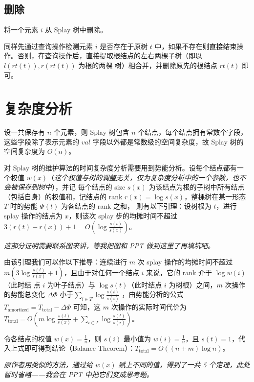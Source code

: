 \documentclass{ctexart}
\begin{document}
    \subsection{删除}

    将一个元素 $i$ 从 Splay 树中删除。

    同样先通过查询操作检测元素 $i$ 是否存在于原树 $t$ 中，如果不存在则直接结束操作。否则，在查询操作后，直接提取根结点的左右两棵子树（即以 $l(rt(t)), r(rt(t))$ 为根的两棵
    树）相合并，并删除原先的根结点 $rt(t)$ 即可。

    \section{复杂度分析}

    设一共保存有 $n$ 个元素，则 Splay 树包含 $n$ 个结点，每个结点拥有常数个字段，这些字段除了表示元素的 $val$ 字段以外都是常数级的空间复杂度，故 Splay 树的空间复杂度为 $O(n)$。

    对 Splay 树的维护算法的时间复杂度分析需要用到势能分析。设每个结点都有一个权值 $w(x)$（\textit{这个权值与树的调整无关，仅为复杂度分析中的一个参数，也不会被保存到树中}），并记
    每个结点的 size $s(x)$ 为该结点为根的子树中所有结点（包括自身）的权值和，记结点的 rank $r(x) = \log s(x)$，整棵树在某一形态 $T$ 时的势能 $\varPhi(t)$ 为各结点的 rank 之和，
    则有以下引理：设树根为 $t$，进行 splay 操作的结点为 $x$，则该次 splay 步的均摊时间不超过 $3(r(t) - r(x)) + 1 = O(\log \frac{s(t)}{s(x)})$。

    \textit{这部分证明需要联系图来讲，等我把图和 PPT 做到这里了再填坑吧。}

    由该引理我们可以作以下推导：连续进行 $m$ 次 splay 操作的均摊时间不超过 $m(3\log \frac{s(t)}{s(x)} + 1)$，且由于对任何一个结点 $i$ 来说，它的 rank 介于 $\log w(i)$（此时结
    点 $i$ 为叶子结点）与 $\log s(t)$（此时结点 $i$ 为树根）之间，$m$ 次操作的势能总变化 $\Delta\varPhi$ 小于$\sum_{i \in T} \log \frac{s(t)}{s(i)}$ ，由势能分析的公式
    $T_\mathrm{amortized} = T_\mathrm{total} - \Delta\varPhi$ 可知，这 $m$ 次操作的实际时间代价为 $T_\mathrm{total} = O(m\log \frac{s(t)}{s(x)} + \sum_{i \in T} \log \frac{s(t)}{s(i)})$。

    令各结点的权值 $w(x) = \frac{1}{n}$，则 $s(i)$ 最小值为 $w(i) = \frac{1}{n}$，且 $s(t) = 1$，代入上式即可得到结论（Balance Theorem）：$T_\mathrm{total} = O((n+m)\log n)$。

    \textit{原作者用类似的方法，通过给 $w(x)$ 赋上不同的值，得到了一共 5 个定理，此处暂时省略——我会在 PPT 中把它们变成思考题。}
\end{document}
